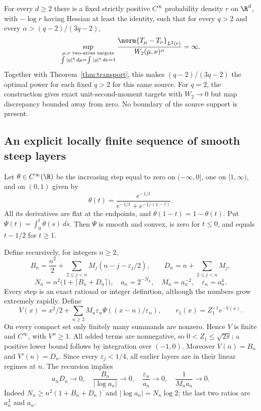 \begin{theorem}\label{thm:steep}
For every $d\ge2$ there is a fixed strictly positive $C^\infty$ probability density $r$ on $\R^d$, with $-\log r$ having Hessian at least the identity, such that for every $q>2$ and every
$\alpha>(q-2)/(3q-2)$,
\[
 \sup_{\substack{\mu,\nu\text{ two-atom targets}\\
       \int|y|^q\,d\mu=\int|y|^q\,d\nu=1}}
 \frac{\norm{T_\mu-T_\nu}_{L^2(r)}}{W_2(\mu,\nu)^\alpha}
 =\infty.
\]
Together with Theorem~\ref{thm:transport}, this makes $(q-2)/(3q-2)$ the optimal power for each fixed $q>2$ for this same source. For $q=2$, the construction gives exact unit-second-moment targets with $W_2\to0$ but map discrepancy bounded away from zero. No boundary of the source support is present.
\end{theorem}

\subsection*{An explicit locally finite sequence of smooth steep layers}
Let $\theta\in C^\infty(\R)$ be the increasing step equal to zero on $(-\infty,0]$, one on $[1,\infty)$, and on $(0,1)$ given by
\[
 \theta(t)=\frac{e^{-1/t}}{e^{-1/t}+e^{-1/(1-t)}}.
\]
All its derivatives are flat at the endpoints, and $\theta(1-t)=1-\theta(t)$. Put $\Psi(t)=\int_0^t\theta(s)\,ds$. Then $\Psi$ is smooth and convex, is zero for $t\le0$, and equals $t-1/2$ for $t\ge1$.

Define recursively, for integers $n\ge2$,
\[
 B_n=\frac{n^2}{2}+\sum_{2\le j<n}M_j(n-j-\varepsilon_j/2),
 \qquad D_n=n+\sum_{2\le j<n}M_j,
\]
\begin{equation}\label{eq:layer-parameters}
 N_n=n^2\bigl(1+\lceil B_n+D_n\rceil\bigr),\quad
 a_n=2^{-N_n},\quad M_n=a_n^{-2},\quad\varepsilon_n=a_n^4.
\end{equation}
Every step is an exact rational or integer definition, although the numbers grow extremely rapidly. Define
\begin{equation}\label{eq:steep-potential}
 V(x)=x^2/2+\sum_{n\ge2}M_n\varepsilon_n
                       \Psi((x-n)/\varepsilon_n),\qquad
 r_1(x)=Z_1^{-1}e^{-V(x)}.
\end{equation}
On every compact set only finitely many summands are nonzero. Hence $V$ is finite and $C^\infty$, with $V''\ge1$. All added terms are nonnegative, so $0<Z_1\le\sqrt{2\pi}$; a positive lower bound follows by integration over $(-1,0)$. Moreover $V(n)=B_n$ and $V'(n)=D_n$. Since every $\varepsilon_j<1/4$, all earlier layers are in their linear regimes at $n$. The recursion implies
\begin{equation}\label{eq:layer-limits}
 a_nD_n\longrightarrow0,\quad
 \frac{B_n}{|\log a_n|}\longrightarrow0,\quad
 \frac{\varepsilon_n}{a_n}\longrightarrow0,\quad
 \frac1{M_na_n}\longrightarrow0.
\end{equation}
Indeed $N_n\ge n^2(1+B_n+D_n)$ and $|\log a_n|=N_n\log2$; the last two ratios are $a_n^3$ and $a_n$.

